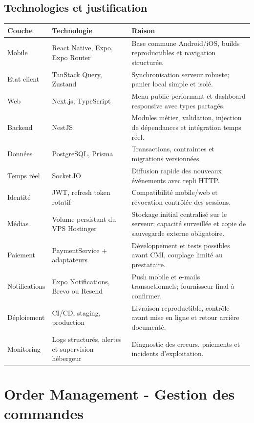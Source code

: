 \documentclass[10pt,a4paper]{article}
\begin{document}
\subsection{Technologies et justification}
\begin{longtable}{@{}L{3.2cm}L{4.2cm}L{8.2cm}@{}}
\toprule
\textbf{Couche} & \textbf{Technologie} & \textbf{Raison} \\
\midrule
\endhead
Mobile & React Native, Expo, Expo Router & Base commune Android/iOS, builds reproductibles et navigation structurée. \\
Etat client & TanStack Query, Zustand & Synchronisation serveur robuste; panier local simple et isolé. \\
Web & Next.js, TypeScript & Menu public performant et dashboard responsive avec types partagés. \\
Backend & NestJS & Modules métier, validation, injection de dépendances et intégration temps réel. \\
Données & PostgreSQL, Prisma & Transactions, contraintes et migrations versionnées. \\
Temps réel & Socket.IO & Diffusion rapide des nouveaux événements avec repli HTTP. \\
Identité & JWT, refresh token rotatif & Compatibilité mobile/web et révocation contrôlée des sessions. \\
Médias & Volume persistant du VPS Hostinger & Stockage initial centralisé sur le serveur; capacité surveillée et copie de sauvegarde externe obligatoire. \\
Paiement & PaymentService + adaptateurs & Développement et tests possibles avant CMI, couplage limité au prestataire. \\
Notifications & Expo Notifications, Brevo ou Resend & Push mobile et e-mails transactionnels; fournisseur final à confirmer. \\
Déploiement & CI/CD, staging, production & Livraison reproductible, contrôle avant mise en ligne et retour arrière documenté. \\
Monitoring & Logs structurés, alertes et supervision hébergeur & Diagnostic des erreurs, paiements et incidents d'exploitation. \\
\bottomrule
\end{longtable}

\section{Order Management - Gestion des commandes}
\end{document}
